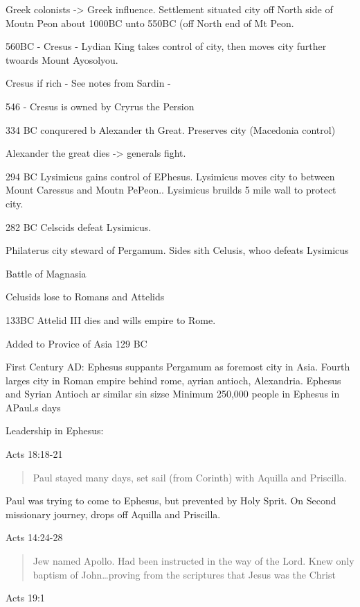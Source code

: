 \documentclass[
]{book}
\begin{document}
Greek colonists -\textgreater{} Greek influence. Settlement situated city off North side of Moutn Peon about 1000BC unto 550BC (off North end of Mt Peon.

560BC - Cresus - Lydian King takes control of city, then moves city further twoards Mount Ayosolyou.

Cresus if rich - See notes from Sardin -

546 - Cresus is owned by Cryrus the Persion

334 BC conqurered b Alexander th Great. Preserves city (Macedonia control)

Alexander the great dies -\textgreater{} generals fight.

294 BC Lysimicus gains control of EPhesus. Lysimicus moves city to between Mount Caressus and Moutn PePeon.. Lysimicus bruilds 5 mile wall to protect city.

282 BC Celscids defeat Lysimicus.

Philaterus city steward of Pergamum. Sides sith Celusis, whoo defeats Lysimicus

Battle of Magnasia

Celusids lose to Romans and Attelids

133BC Attelid III dies and wills empire to Rome.

Added to Provice of Asia 129 BC

First Century AD: Ephesus suppants Pergamum as foremost city in Asia. Fourth larges city in Roman empire behind rome, ayrian antioch, Alexandria. Ephesus and Syrian Antioch ar similar sin sizse Minimum 250,000 people in Ephesus in APaul.s days

Leadership in Ephesus:

Acts 18:18-21

\begin{quote}
Paul stayed many days, set sail (from Corinth) with Aquilla and Priscilla.
\end{quote}

Paul was trying to come to Ephesus, but prevented by Holy Sprit. On Second missionary journey, drops off Aquilla and Priscilla.

Acts 14:24-28

\begin{quote}
Jew named Apollo. Had been instructed in the way of the Lord. Knew only baptism of John\ldots proving from the scriptures that Jesus was the Christ
\end{quote}

Acts 19:1
\end{document}
